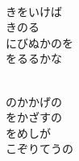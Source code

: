 \documentclass[10pt,b5j]{tarticle} %
\begin{document}
\begin{enumerate}
\begin{minipage}[c]{\blocksize}
        \vspace{\linespace}
        \item~\\
        きをいけば\\
        きのる\\
        にびぬかのを\\
        をるるかな
        
        \vspace{\linespace}
        \item~\\
        のかかげの\\
        をかざすの\\
        をめしが\\
        こぞりてうの
    
    \end{minipage}
\end{enumerate} %
\end{document}

